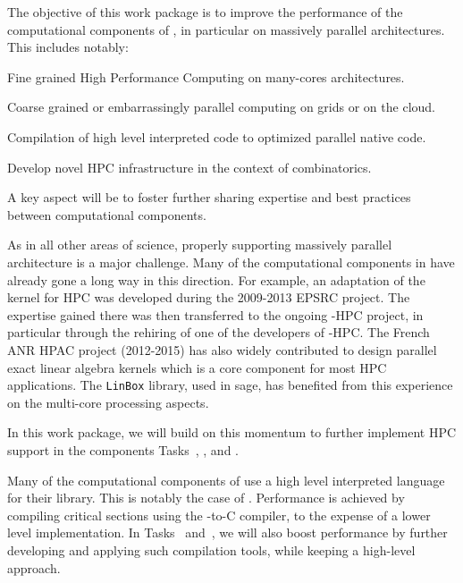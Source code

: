 \begin{workpackage}[id=hpc,wphases=0-48,
  title=High Performance Computing,
  PSRM=1, %
  LLRM=12, %
  SARM=18, %
  UKRM=1, %
  UBRM=1, %
  UJFRM=12] %
  
\begin{wpobjectives}
  The objective of this work package is to improve the performance of
  the computational components of \TheProject, in particular on
  massively parallel architectures. This includes notably:
  \begin{compactitem}
  \item Fine grained High Performance Computing on many-cores architectures.
  \item Coarse grained or embarrassingly parallel computing on grids or on the cloud.
  \item Compilation of high level interpreted code to optimized parallel native code.
  \item Develop novel HPC infrastructure in the context of combinatorics.
  \end{compactitem}
  A key aspect will be to foster further sharing expertise and best
  practices between computational components.
\end{wpobjectives}

\begin{wpdescription}
  As in all other areas of science, properly supporting massively
  parallel architecture is a major challenge. Many of the
  computational components in \TheProject have already gone a long way
  in this direction. For example, an adaptation of the \GAP kernel for
  HPC was developed during the 2009-2013 EPSRC project. The expertise
  gained there was then transferred to the ongoing \Singular-HPC
  project, in particular through the rehiring of one of the developers
  of \GAP-HPC. The French ANR HPAC project (2012-2015) has also widely contributed to design
  parallel exact linear algebra kernels  which is a core component for most HPC
  applications. The \texttt{LinBox} library, used in sage, has benefited from this
  experience on the multi-core processing aspects. 

  In this work package, we will build on this momentum to further
  implement HPC support in the components Tasks~,
  , and .


  Many of the computational components of \TheProject use a high level
  interpreted language for their library. This is notably the case of
  \Sage. Performance is achieved by compiling critical sections using
  the \Cython \Python-to-C compiler, to the expense of a lower level
  implementation. In Tasks~
  and~, we will also boost performance by
  further developing and applying such compilation tools, while
  keeping a high-level approach.


\end{wpdescription}
\end{workpackage}

